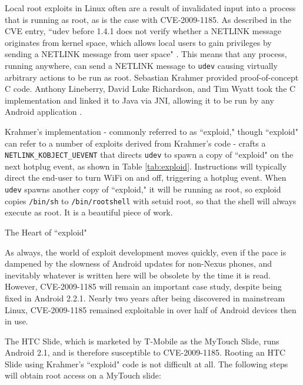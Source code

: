 Local root exploits in Linux often are a result of invalidated input into a process that is running as root, as is the case with
CVE-2009-1185.  As described in the CVE entry, ``udev before 1.4.1 does not verify whether a NETLINK message originates from kernel
space, which allows local users to gain privileges by sending a NETLINK message from user space" \cite{udevcve}.  This means that
any process, running anywhere, can send a NETLINK message to \texttt{udev} causing virtually arbitrary actions to be run as root.
Sebastian Krahmer provided proof-of-concept C code.  Anthony Lineberry, David Luke Richardson, and Tim Wyatt took the C
implementation and linked it to Java via JNI, allowing it to be run by any Android application \cite{arentpermissions}.

Krahmer's implementation - commonly referred to as ``exploid," though ``exploid" can refer to a number of exploits derived from
Krahmer's code - crafts a \texttt{NETLINK\_KOBJECT\_UEVENT} that directs \texttt{udev} to spawn a copy of ``exploid" on the next
hotplug event, as shown in Table \ref{tab:exploid}.  Instructions will typically direct the end-user to turn WiFi on and off,
triggering a hotplug event.  When \texttt{udev} spawns another copy of ``exploid," it will be running as root, so exploid copies
\texttt{/bin/sh} to \texttt{/bin/rootshell} with setuid root, so that the shell will always execute as root.  It is a beautiful
piece of work.

\begin{table}[htb]

\caption{The Heart of ``exploid"}
\label{tab:exploid}
\end{table}

As always, the world of exploit development moves quickly, even if the pace is dampened by the slowness of Android updates for
non-Nexus phones, and inevitably whatever is written here will be obsolete by the time it is read.  However, CVE-2009-1185 will
remain an important case study, despite being fixed in Android 2.2.1.  Nearly two years after being discovered in mainstream Linux,
CVE-2009-1185 remained exploitable in over half of Android devices then in use.

The HTC Slide, which is marketed by T-Mobile as the MyTouch Slide, runs Android 2.1, and is therefore susceptible to CVE-2009-1185. 
Rooting an HTC Slide using Krahmer's ``exploid" code is not difficult at all. The following steps will obtain root access on a
MyTouch slide: 

